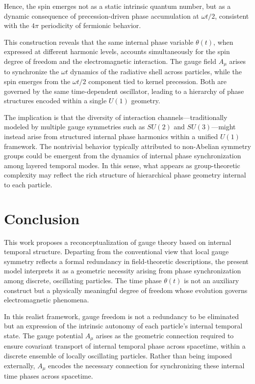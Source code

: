 \documentclass[%
 reprint,
 amsmath,amssymb,
 aps,
]{revtex4-1}
\numberwithin{equation}{section}%
\begin{document}
Hence, the spin emerges not as a static intrinsic quantum number, but as a dynamic consequence of precession-driven phase accumulation at $\omega t/2$, consistent with the $4\pi$ periodicity of fermionic behavior.

This construction reveals that the same internal phase variable $\theta(t)$, when expressed at different harmonic levels, accounts simultaneously for the spin degree of freedom and the electromagnetic interaction. The gauge field $A_\mu$ arises to synchronize the $\omega t$ dynamics of the radiative shell across particles, while the spin emerges from the $\omega t/2$ component tied to kernel precession. Both are governed by the same time-dependent oscillator, leading to a hierarchy of phase structures encoded within a single $U(1)$ geometry.

The implication is that the diversity of interaction channels—traditionally modeled by multiple gauge symmetries such as $SU(2)$ and $SU(3)$—might instead arise from structured internal phase harmonics within a unified $U(1)$ framework. The nontrivial behavior typically attributed to non-Abelian symmetry groups could be emergent from the dynamics of internal phase synchronization among layered temporal modes. In this sense, what appears as group-theoretic complexity may reflect the rich structure of hierarchical phase geometry internal to each particle.


\newpage


\section{Conclusion}

This work proposes a reconceptualization of gauge theory based on internal temporal structure. Departing from the conventional view that local gauge symmetry reflects a formal redundancy in field-theoretic descriptions, the present model interprets it as a geometric necessity arising from phase synchronization among discrete, oscillating particles. The time phase $\theta(t)$ is not an auxiliary construct but a physically meaningful degree of freedom whose evolution governs electromagnetic phenomena.

In this realist framework, gauge freedom is not a redundancy to be eliminated but an expression of the intrinsic autonomy of each particle's internal temporal state. The gauge potential $A_\mu$ arises as the geometric connection required to ensure covariant transport of internal temporal phase across spacetime, within a discrete ensemble of locally oscillating particles. Rather than being imposed externally, $A_\mu$ encodes the necessary connection for synchronizing these internal time phases across spacetime.
\end{document}

